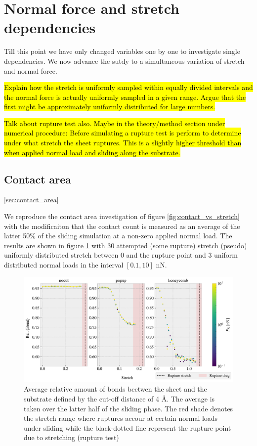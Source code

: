 \section{Normal force and stretch dependencies}
Till this point we have only changed variables one by one to investigate single dependencies. We now advance the sutdy to a simultaneous variation of stretch and normal force.

\hl{Explain how the stretch is uniformly sampled within equally divided intervals and the normal force is actually uniformly sampled in a given range. Argue that the first might be approximately uniformly distributed for large numbers.}

\hl{Talk about rupture test also. Maybe in the theory/method section under numerical procedure: Before simulating a rupture test is perform to determine under what stretch the sheet ruptures. This is a slightly higher threshold than when applied normal load and sliding along the substrate.}

\subsection{Contact area}\ref{sec:contact_area}

We reproduce the contact area investigation of figure \ref{fig:contact_vs_stretch} with the modificaiton that the contact count is measured as an average of the latter 50\% of the sliding simulation at a non-zero applied normal load. The results are shown in figure \ref{fig:multi_stretch_contact} with 30 attempted (some rupture) stretch (pseudo) uniformly distributed stretch between 0 and the rupture point and 3 uniform distributed normal loads in the interval $[0.1, 10]$ nN. 


\begin{figure}[H]
  \centering
  \includegraphics[width=\linewidth]{figures/baseline/multi_stretch_area_compare.pdf}
  \caption{Average relative amount of bonds beetwen the sheet and the substrate defined by the cut-off distance of 4 Å. The average is taken over the latter half of the sliding phase. The red shade denotes the stretch range where ruptures accour at certain normal loads under sliding while the black-dotted line represent the rupture point due to stretching (rupture test)}
  \label{fig:multi_stretch_contact}
\end{figure}

